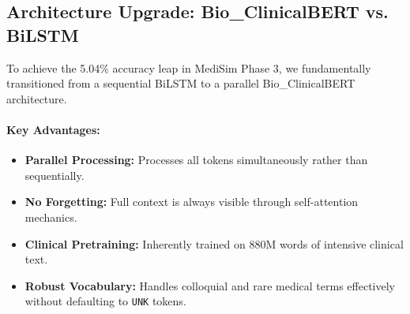 \documentclass[11pt,a4paper]{article}
\begin{document}
\subsection{Architecture Upgrade: Bio\_ClinicalBERT vs. BiLSTM}
To achieve the 5.04\% accuracy leap in MediSim Phase 3, we fundamentally transitioned from a sequential BiLSTM to a parallel Bio\_ClinicalBERT architecture. 

\paragraph{Key Advantages:}
\begin{itemize}[noitemsep]
    \item \textbf{Parallel Processing:} Processes all tokens simultaneously rather than sequentially.
    \item \textbf{No Forgetting:} Full context is always visible through self-attention mechanics.
    \item \textbf{Clinical Pretraining:} Inherently trained on 880M words of intensive clinical text.
    \item \textbf{Robust Vocabulary:} Handles colloquial and rare medical terms effectively without defaulting to \texttt{UNK} tokens.
\end{itemize}

\begin{table}[htbp]
\centering
{}
\caption{Direct architectural and performance comparison demonstrating the superiority of the Bio\_ClinicalBERT upgrade.}
\label{tab:bilstm_vs_bert}
\end{table}
\end{document}
